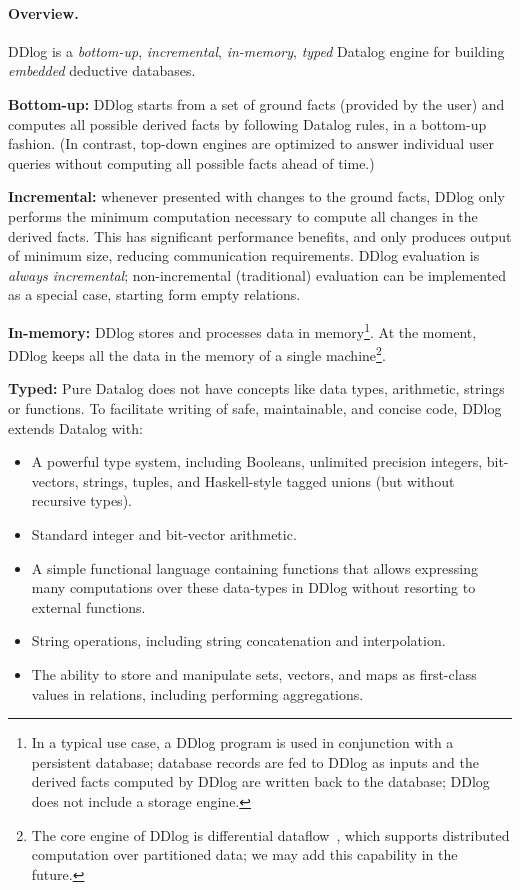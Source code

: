 \paragraph{Overview.}
DDlog is a \emph{bottom-up}, \emph{incremental}, \emph{in-memory},
\emph{typed} Datalog engine for building \emph{embedded} deductive
databases.

\textbf{Bottom-up:} DDlog starts from a set of ground facts (provided
by the user) and computes all possible derived facts by following
Datalog rules, in a bottom-up fashion.  (In contrast, top-down engines
are optimized to answer individual user queries without computing all
possible facts ahead of time.)

\textbf{Incremental:} whenever presented with changes to the ground
facts, DDlog only performs the minimum computation necessary to
compute all changes in the derived facts.  This has significant
performance benefits, and only produces output of minimum size,
reducing communication requirements.  DDlog evaluation is \emph{always
  incremental}; non-incremental (traditional) evaluation can be
implemented as a special case, starting form empty relations.

\textbf{In-memory:} DDlog stores and processes data in
memory\footnote{In a typical use case, a DDlog program is used in
  conjunction with a persistent database; database records are fed to
  DDlog as inputs and the derived facts computed by DDlog are written
  back to the database; DDlog does not include a storage engine.}.  At
the moment, DDlog keeps all the data in the memory of a single
machine\footnote{The core engine of DDlog is differential
  dataflow~\cite{differential-dataflow}, which supports distributed
  computation over partitioned data; we may add this capability in the
  future.}.

\textbf{Typed:} Pure Datalog does not have concepts like data types,
arithmetic, strings or functions.  To facilitate writing of safe,
maintainable, and concise code, DDlog extends Datalog with:
\begin{itemize}
\item A powerful type system, including Booleans, unlimited
  precision integers, bit-vectors, strings, tuples, and
  Haskell-style tagged unions (but without recursive types).

\item Standard integer and bit-vector arithmetic.

\item A simple functional language containing functions that allows
  expressing many computations over these data-types in DDlog without
  resorting to external functions.

\item String operations, including string concatenation and
  interpolation.

\item The ability to store and manipulate sets, vectors, and maps as
  first-class values in relations, including performing aggregations.
\end{itemize}

